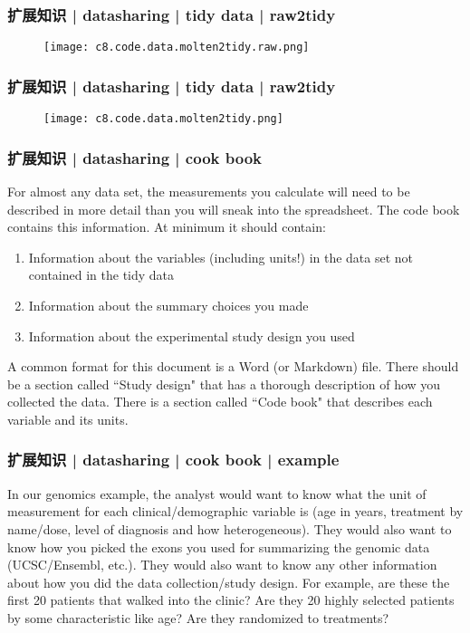 \begin{frame}
  \frametitle{扩展知识 | datasharing | tidy data | raw2tidy}
  \begin{figure}
    \centering
    \texttt{[image: c8.code.data.molten2tidy.raw.png]}
  \end{figure}
\end{frame}

\begin{frame}
  \frametitle{扩展知识 | datasharing | tidy data | raw2tidy}
  \begin{figure}
    \centering
    \texttt{[image: c8.code.data.molten2tidy.png]}
  \end{figure}
\end{frame}

\begin{frame}
  \frametitle{扩展知识 | datasharing | cook book}
  For almost any data set, the measurements you calculate will need to be described in more detail than you will sneak into the spreadsheet.  The code book contains this information. At minimum it should contain:
  \begin{enumerate}
    \item Information about the variables (including units!) in the data set not contained in the tidy data
    \item Information about the summary choices you made
    \item Information about the experimental study design you used
  \end{enumerate}

  A common format for this document is a Word (or Markdown) file. There should be a section called ``Study design" that has a thorough description of how you collected the data. There is a section called ``Code book" that describes each variable and its units. 
\end{frame}

\begin{frame}
  \frametitle{扩展知识 | datasharing | cook book | example}
  In our genomics example, the analyst would want to know what the unit of measurement for each clinical/demographic variable is (age in years, treatment by name/dose, level of diagnosis and how heterogeneous). They would also want to know how you picked the exons you used for summarizing the genomic data (UCSC/Ensembl, etc.). They would also want to know any other information about how you did the data collection/study design. For example, are these the first 20 patients that walked into the clinic? Are they 20 highly selected patients by some characteristic like age? Are they randomized to treatments? 
\end{frame}


